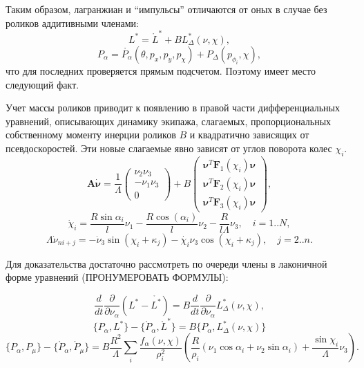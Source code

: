 
Таким образом, лагранжиан и ``импульсы'' отличаются от оных в случае без роликов аддитивными членами:
$$ L^{*} = \mathring{L}^{*} + BL^{*}_\Delta(\nu, \chi),$$
$$ P_\alpha = \mathring{P_\alpha}(\theta, p_x, p_y, p_\chi) + P_\Delta(p_{\phi_i}, \chi),$$
что для последних проверяется прямым подсчетом. Поэтому имеет место следующий факт.

\begin{stmt}
    Учет массы роликов приводит к появлению в правой части дифференциальных уравнений, описывающих динамику экипажа, слагаемых, пропорциональных собственному моменту инерции роликов $B$ и квадратично зависящих от псевдоскоростей. Эти новые слагаемые явно зависят от углов поворота колес $\chi_i$.
    $$\boldsymbol{A}\dot{\boldsymbol{\nu}} = \frac1\Lambda
    \left(
    \begin{array}{c}
         \nu_2\nu_3  \\
         -\nu_1\nu_3 \\
         0
    \end{array}
    \right) + B
     \left(
    \begin{array}{c}
         \boldsymbol{\nu}^T\boldsymbol{F}_1(\chi_i)\boldsymbol{\nu}  \\
         \boldsymbol{\nu}^T\boldsymbol{F}_2(\chi_i)\boldsymbol{\nu} \\
         \boldsymbol{\nu}^T\boldsymbol{F}_3(\chi_i)\boldsymbol{\nu}
    \end{array}
    \right),
    $$
    $$
    \dot{\chi}_i = \frac{R\sin\alpha_i}{l}\nu_1 - \frac{R\cos(\alpha_i)}{l}\nu_2 - \frac{R}{l\Lambda}\nu_3, \quad i = 1..N,
    $$
    $$
    \Lambda\dot{\nu}_{ni+j} = -\dot{\nu}_3\sin(\chi_i+\kappa_j) - \dot{\chi_i}\nu_3\cos(\chi_i+\kappa_j), \quad j = 2..n.
    $$
\end{stmt}

Для доказательства достаточно рассмотреть по очереди члены в лаконичной форме уравнений (ПРОНУМЕРОВАТЬ ФОРМУЛЫ):

$$ \frac{d}{dt}\frac{\partial }{\partial \nu_\alpha}(L^{*} - \mathring{L^{*}}) = B\frac{d}{dt}\frac{\partial}{\partial \nu_\alpha}L^{*}_\Delta(\nu, \chi), $$
$$ \{P_\alpha, L^{*}\} - \{\mathring{P}_\alpha, \mathring{L}^{*}\} = B\{ P_\alpha, L^{*}_\Delta(\nu, \chi) \} $$
$$\{P_\alpha, P_\mu\} - \{\mathring{P}_\alpha, \mathring{P}_\mu\} = B\frac{R^2}{\Lambda}\sum_i\frac{f_\alpha(\nu, \chi)}{\rho^2_i}(\frac{R}{\rho_i}(\nu_1\cos\alpha_i + \nu_2\sin\alpha_i) + \frac{\sin\chi_i}{\Lambda}\nu_3).$$


